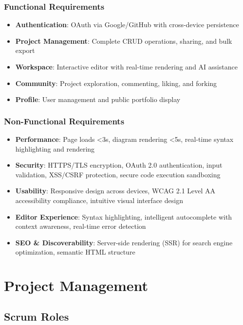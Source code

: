 \subsubsection{Functional Requirements}
\begin{itemize}
    \item \textbf{Authentication}: OAuth via Google/GitHub with cross-device persistence
    \item \textbf{Project Management}: Complete CRUD operations, sharing, and bulk export
    \item \textbf{Workspace}: Interactive editor with real-time rendering and AI assistance
    \item \textbf{Community}: Project exploration, commenting, liking, and forking
    \item \textbf{Profile}: User management and public portfolio display
\end{itemize}

\subsubsection{Non-Functional Requirements}
\begin{itemize}
    \item \textbf{Performance}: Page loads <3s, diagram rendering <5s, real-time syntax highlighting and rendering
    \item \textbf{Security}: HTTPS/TLS encryption, OAuth 2.0 authentication, input validation, XSS/CSRF protection, secure code execution sandboxing
    \item \textbf{Usability}: Responsive design across devices, WCAG 2.1 Level AA accessibility compliance, intuitive visual interface design
    \item \textbf{Editor Experience}: Syntax highlighting, intelligent autocomplete with context awareness, real-time error detection
    \item \textbf{SEO \& Discoverability}: Server-side rendering (SSR) for search engine optimization, semantic HTML structure
\end{itemize}

\section{Project Management}

\subsection{Scrum Roles}

